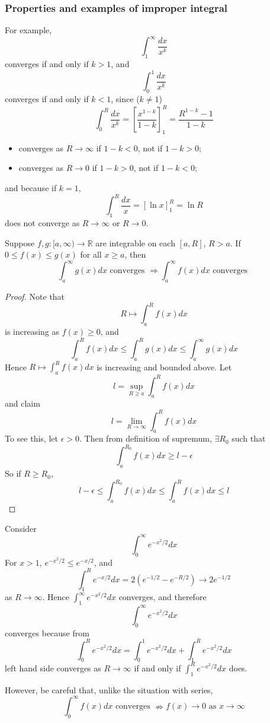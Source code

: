\documentclass[10pt, a4paper, twoside]{report}
\begin{document}
\subsubsection{Properties and examples of improper integral}
For example,
\[\int_1^\infty\frac{dx}{x^k}\] converges if and only if \(k>1\), and 
\[\int_0^1\frac{dx}{x^k}\] converges if and only if \(k<1\), since (\(k\neq 1\))
\[\int_0^R\frac{dx}{x^k}=\left[\frac{x^{1-k}}{1-k}\right]_1^R=\frac{R^{1-k}-1}{1-k}\]
\begin{itemize}
    \item converges as \(R\to\infty\) if \(1-k<0\), not if \(1-k>0\);
    \item converges as \(R\to 0\) if \(1-k>0\), not if \(1-k<0\);
\end{itemize}
and because if \(k=1\),
\[\int_1^R\frac{dx}{x}=\left[\ln x\right]_1^R=\ln R\]
does not converge as \(R\to\infty\) or \(R\to 0\).
\begin{lemma}
    Suppose \(f,g:[a,\infty)\to\mathbb{R}\) are integrable on each \([a,R]\), \(R>a\). If \(0\leq f(x)\leq g(x)\) for all \(x\geq a\), then 
    \[\int_a^\infty g(x)dx\text{  converges }\Rightarrow\int_a^\infty f(x)dx\text{  converges }\]
\end{lemma}
\begin{proof}
    Note that 
    \[R\mapsto\int_a^Rf(x)dx\]
    is increasing as \(f(x)\geq 0\), and 
    \[\int_a^Rf(x)dx\leq\int_a^Rg(x)dx\leq\int_a^\infty g(x)dx\]
    Hence \(R\mapsto\int_a^Rf(x)dx\) is increasing and bounded above. Let 
    \[l=\sup_{R\geq a}\int_a^Rf(x)dx\]
    and claim 
    \[l=\lim_{R\to\infty}\int_a^Rf(x)dx\]
    To see this, let \(\epsilon>0\). Then from definition of supremum, \(\exists R_0\) such that 
    \[\int_a^{R_0}f(x)dx\geq l-\epsilon\]
    So if \(R\geq R_0\),
    \[l-\epsilon\leq\int_a^{R_0}f(x)dx\leq\int_a^Rf(x)dx\leq l\]
\end{proof}
\begin{example}
    Consider 
    \[\int_0^\infty e^{-x^2/2}dx\]
    For \(x>1\), \(e^{-x^2/2}\leq e^{-x/2}\), and
    \[\int_1^Re^{-x/2}dx=2(e^{-1/2}-e^{-R/2})\to 2e^{-1/2}\]
    as \(R\to\infty\).
    Hence \(\int_1^\infty e^{-x^2/2}dx\) converges, and therefore 
\[\int_0^\infty e^{-x^2/2}dx\] converges because from
\[\int_0^Re^{-x^2/2}dx=\int_0^1e^{-x^2/2}dx+\int_1^Re^{-x^2/2}dx\]
left hand side converges as \(R\to\infty\) if and only if \(\int_1^Re^{-x^2/2}dx\) does.
\end{example}
However, be careful that, unlike the situation with series,
\[\int_0^\infty f(x)dx\text{  converges }\nRightarrow f(x)\to 0\text{ as }x\to\infty\]
\end{document}
